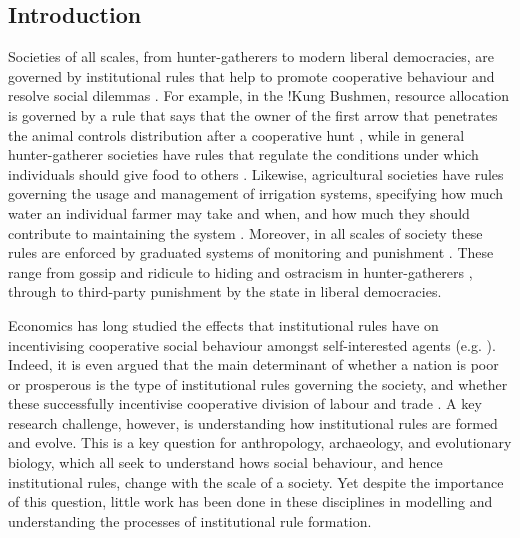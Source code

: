 \documentclass{rstb}
\begin{document}
\begin{linenumbers}
    

\section*{Introduction}
Societies of all scales, from hunter-gatherers to modern liberal democracies, are governed by institutional rules \cite{North:1990:a,Ostrom:1990:a} that help to promote cooperative behaviour and resolve social dilemmas \cite{Greif:2006:a,Singh:2017:a,Powers:2021:a}. For example, in the !Kung Bushmen, resource allocation is governed by a rule that says that the owner of the first arrow that penetrates the animal controls distribution after a cooperative hunt \cite{Testart:1987:a}, while in general hunter-gatherer societies have rules that regulate the conditions under which individuals should give food to others \cite{Kaplan:2009:a}. Likewise, agricultural societies have rules governing the usage and management of irrigation systems, specifying how much water an individual farmer may take and when, and how much they should contribute to maintaining the system \cite{Ostrom:1990:a,Guala:2012:a}. Moreover, in all scales of society these rules are enforced by graduated systems of monitoring and punishment \cite{Powers:2021:a}. These range from gossip and ridicule to hiding and ostracism in hunter-gatherers \cite{Boehm:1999:a}, through to third-party punishment by the state in liberal democracies.

Economics has long studied the effects that institutional rules have on incentivising cooperative social behaviour amongst self-interested agents (e.g. \cite{North:1990:a,Reiter:1996:a,Greif:2006:a}). Indeed, it is even  argued that the main determinant of whether a nation is poor or prosperous is the type of institutional rules governing the society, and whether these successfully incentivise cooperative division of labour and trade \cite{Acemoglu:2011:a}. A key research challenge, however, is understanding how institutional rules are formed and evolve. This is a key question for anthropology, archaeology, and evolutionary biology, which all seek to understand hows social behaviour, and hence institutional rules, change with the scale of a society. Yet despite the importance of this question, little work has been done in these disciplines in modelling and understanding the processes of institutional rule formation.


\end{linenumbers}
\end{document}
